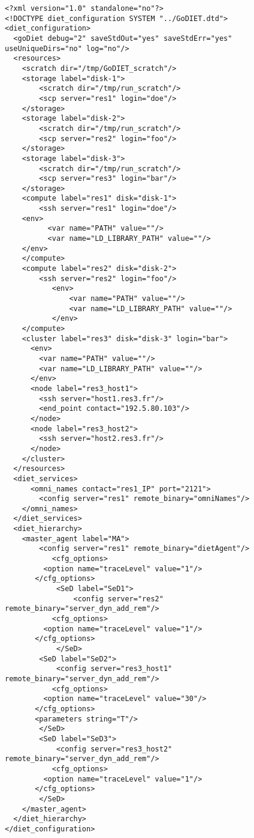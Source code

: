 \begin{lstlisting}
<?xml version="1.0" standalone="no"?>
<!DOCTYPE diet_configuration SYSTEM "../GoDIET.dtd">
<diet_configuration>
  <goDiet debug="2" saveStdOut="yes" saveStdErr="yes" useUniqueDirs="no" log="no"/>
  <resources>
    <scratch dir="/tmp/GoDIET_scratch"/>
    <storage label="disk-1">
        <scratch dir="/tmp/run_scratch"/>
        <scp server="res1" login="doe"/>
    </storage>
    <storage label="disk-2">
        <scratch dir="/tmp/run_scratch"/>
        <scp server="res2" login="foo"/>
    </storage>
    <storage label="disk-3">
        <scratch dir="/tmp/run_scratch"/>
        <scp server="res3" login="bar"/>
    </storage>
    <compute label="res1" disk="disk-1">
        <ssh server="res1" login="doe"/>
	<env>
	      <var name="PATH" value=""/>
	      <var name="LD_LIBRARY_PATH" value=""/>
	</env>
    </compute>
    <compute label="res2" disk="disk-2">
        <ssh server="res2" login="foo"/>
	       <env>
		       <var name="PATH" value=""/>
		       <var name="LD_LIBRARY_PATH" value=""/>
	       </env>
    </compute>
	<cluster label="res3" disk="disk-3" login="bar">
      <env> 
      	<var name="PATH" value=""/>
        <var name="LD_LIBRARY_PATH" value=""/>
      </env>
      <node label="res3_host1">
        <ssh server="host1.res3.fr"/> 
        <end_point contact="192.5.80.103"/>
      </node>
      <node label="res3_host2">
        <ssh server="host2.res3.fr"/>
      </node>
    </cluster>
  </resources>
  <diet_services>
	  <omni_names contact="res1_IP" port="2121">
        <config server="res1" remote_binary="omniNames"/>
    </omni_names>
  </diet_services>
  <diet_hierarchy>
    <master_agent label="MA">
        <config server="res1" remote_binary="dietAgent"/>
           <cfg_options>
	     <option name="traceLevel" value="1"/>
	   </cfg_options>
            <SeD label="SeD1">
                <config server="res2" remote_binary="server_dyn_add_rem"/>
           <cfg_options>
	     <option name="traceLevel" value="1"/>
	   </cfg_options>
            </SeD>
        <SeD label="SeD2">
            <config server="res3_host1" remote_binary="server_dyn_add_rem"/>
           <cfg_options>
	     <option name="traceLevel" value="30"/>
	   </cfg_options>
	   <parameters string="T"/>
        </SeD>
        <SeD label="SeD3">
            <config server="res3_host2" remote_binary="server_dyn_add_rem"/>
           <cfg_options>
	     <option name="traceLevel" value="1"/>
	   </cfg_options>
        </SeD>
    </master_agent>
  </diet_hierarchy>      
</diet_configuration>
\end{lstlisting}